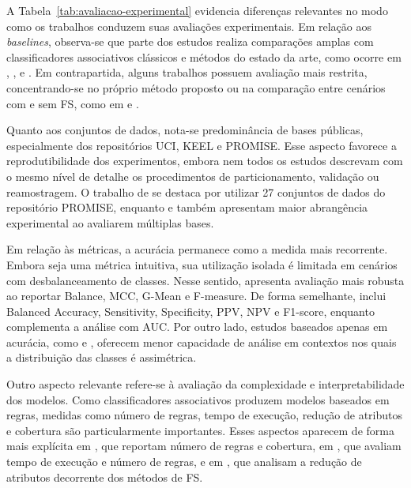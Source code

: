 A Tabela~\ref{tab:avaliacao-experimental} evidencia diferenças relevantes no modo como os trabalhos conduzem suas avaliações experimentais. Em relação aos \textit{baselines}, observa-se que parte dos estudos realiza comparações amplas com classificadores associativos clássicos e métodos do estado da arte, como ocorre em , ,  e . Em contrapartida, alguns trabalhos possuem avaliação mais restrita, concentrando-se no próprio método proposto ou na comparação entre cenários com e sem FS, como em  e .

Quanto aos conjuntos de dados, nota-se predominância de bases públicas, especialmente dos repositórios UCI, KEEL e PROMISE. Esse aspecto favorece a reprodutibilidade dos experimentos, embora nem todos os estudos descrevam com o mesmo nível de detalhe os procedimentos de particionamento, validação ou reamostragem. O trabalho de  se destaca por utilizar 27 conjuntos de dados do repositório PROMISE, enquanto  e  também apresentam maior abrangência experimental ao avaliarem múltiplas bases.

Em relação às métricas, a acurácia permanece como a medida mais recorrente. Embora seja uma métrica intuitiva, sua utilização isolada é limitada em cenários com desbalanceamento de classes. Nesse sentido,  apresenta avaliação mais robusta ao reportar Balance, MCC, G-Mean e F-measure. De forma semelhante,  inclui Balanced Accuracy, Sensitivity, Specificity, PPV, NPV e F1-score, enquanto  complementa a análise com AUC. Por outro lado, estudos baseados apenas em acurácia, como  e , oferecem menor capacidade de análise em contextos nos quais a distribuição das classes é assimétrica.

Outro aspecto relevante refere-se à avaliação da complexidade e interpretabilidade dos modelos. Como classificadores associativos produzem modelos baseados em regras, medidas como número de regras, tempo de execução, redução de atributos e cobertura são particularmente importantes. Esses aspectos aparecem de forma mais explícita em , que reportam número de regras e cobertura, em , que avaliam tempo de execução e número de regras, e em , que analisam a redução de atributos decorrente dos métodos de FS.

